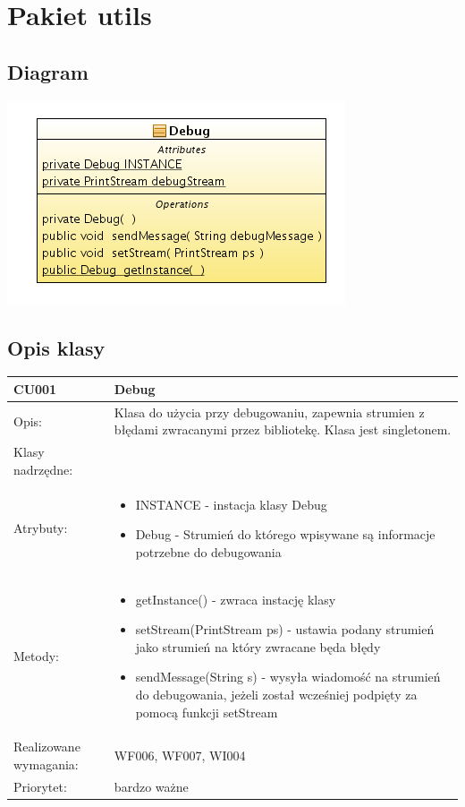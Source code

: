 \documentclass[a4paper,10pt]{article}
\begin{document}
\section{Pakiet utils}

\subsection{Diagram}

\includegraphics[width=0.5\linewidth]{./modelowanie/OV_UML/UtilsDiagram.png}

\subsection{Opis klasy}

\begin{center}

\begin{tabular}{|m{3cm}|m{9cm}|} \hline

CU001 & Debug \\ \hline
Opis: & Klasa do użycia przy debugowaniu, zapewnia strumien z błędami zwracanymi przez bibliotekę. Klasa jest singletonem.\\ \hline
Klasy nadrzędne: &     \\ \hline
Atrybuty: & \begin{itemize}
 \item INSTANCE - instacja klasy Debug
 \item Debug - Strumień do którego wpisywane są informacje potrzebne do debugowania
\end{itemize}
 \\ \hline
Metody: & \begin{itemize}
 \item getInstance() - zwraca instację klasy
 \item setStream(PrintStream ps) - ustawia podany strumień jako strumień na który zwracane będa błędy
 \item sendMessage(String s) - wysyła wiadomość na strumień do debugowania, jeżeli został wcześniej podpięty za pomocą funkcji setStream 	
\end{itemize}
  \\ \hline
Realizowane wymagania: & WF006, WF007, WI004 \\ \hline
Priorytet: & bardzo ważne  \\ \hline

\end{tabular}
\end{center}

%
\end{document}
